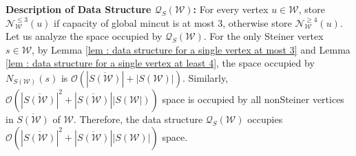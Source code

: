 \documentclass[letterpaper,11pt]{article}
\begin{document}
\noindent
\textbf{Description of Data Structure ${\mathcal Q}_S({\mathcal W})$:} For every vertex $u\in {\mathcal W}$, store ${\mathcal N}^{\le 3}_{\mathcal W}(u)$ if capacity of global mincut is at most $3$, otherwise store ${\mathcal N}^{\ge 4}_{\mathcal W}(u)$.\\

Let us analyze the space occupied by ${\mathcal Q}_S({\mathcal W})$. For the only Steiner vertex $s\in {\mathcal W}$, by Lemma \ref{lem : data structure for a single vertex at most 3} and Lemma \ref{lem : data structure for a single vertex at least 4}, the space occupied by $N_{S({\mathcal W})}(s)$ is ${\mathcal O}(|\overline{S({\mathcal W})}|+|S({\mathcal W})|)$. Similarly, ${\mathcal O}(|\overline{S({\mathcal W})}|^2+|\overline{S({\mathcal W})}||S({\mathcal W}|))$ space is occupied by all nonSteiner vertices in $\overline{S({\mathcal W})}$ of ${\mathcal W}$.
Therefore, the data structure ${\mathcal Q}_S({\mathcal W})$ occupies ${\mathcal O}(|\overline{S({\mathcal W})}|^2+|\overline{S({\mathcal W})}||S({\mathcal W})|)$ space.\\
\end{document}
